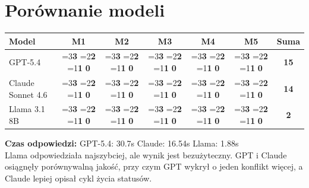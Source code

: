 \documentclass[12pt,a4paper]{article}
\newcommand{\scorebox}[1]{%
  \ifnum#1=3\colorbox{score3}{\textbf{3}}%
  \else\ifnum#1=2\colorbox{score2}{\textbf{2}}%
  \else\ifnum#1=1\colorbox{score1}{\textbf{1}}%
  \else\colorbox{score0}{\textbf{0}}\fi\fi\fi
}
\begin{document}
\section{Porównanie modeli}

\begin{tabular}{lccccc|c}
\toprule
\textbf{Model} & \textbf{M1} & \textbf{M2} & \textbf{M3} & \textbf{M4} & \textbf{M5} & \textbf{Suma} \\
\midrule
GPT-5.4            & \scorebox{3} & \scorebox{3} & \scorebox{3} & \scorebox{3} & \scorebox{3} & \textbf{15} \\
Claude Sonnet 4.6  & \scorebox{3} & \scorebox{2} & \scorebox{3} & \scorebox{3} & \scorebox{3} & \textbf{14} \\
Llama 3.1 8B       & \scorebox{0} & \scorebox{0} & \scorebox{1} & \scorebox{1} & \scorebox{0} & \textbf{2}  \\
\bottomrule
\end{tabular}

\vspace{0.5em}
\begin{mdframed}[backgroundcolor=metabg, linewidth=0pt, innerleftmargin=10pt, innerrightmargin=10pt, innertopmargin=6pt, innerbottommargin=6pt]
\small
\textbf{Czas odpowiedzi:} GPT-5.4: 30.7s \quad Claude: 16.54s \quad Llama: 1.88s\\
Llama odpowiedziała najszybciej, ale wynik jest bezużyteczny. GPT i Claude osiągnęły porównywalną jakość, przy czym GPT wykrył o jeden konflikt więcej, a Claude lepiej opisał cykl życia statusów.
\end{mdframed}
\end{document}
